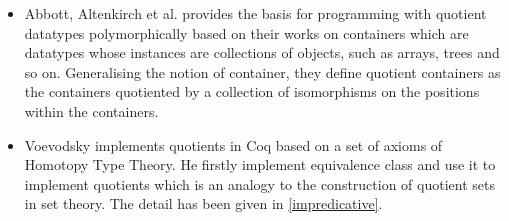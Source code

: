 \begin{itemize}
\item Abbott, Altenkirch et al. \cite{abb:04} provides the basis for
programming with quotient datatypes polymorphically based on their
works on containers which are datatypes whose instances are
collections of objects, such as arrays, trees and so on. Generalising
the notion of container, they define quotient containers as the
containers quotiented by a collection of isomorphisms on the positions
within the containers.

\item Voevodsky \cite{voe:hset} implements quotients in Coq based on a set
of axioms of Homotopy Type Theory. He firstly implement
equivalence class and use it to implement quotients which is an
analogy to the construction of quotient sets in set theory. The detail has been given in \autoref{impredicative}.


\end{itemize}






